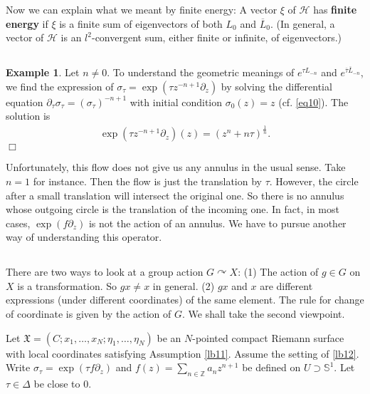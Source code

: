 \documentclass[11pt,b5paper,notitlepage]{article}
\theoremstyle{definition}
\newtheorem{eg}[df]{Example}
\theoremstyle{plain}
\newcommand{\fk}{\mathfrak}
\newcommand{\mc}{\mathcal}
\newcommand{\ovl}{\overline}
\newcommand{\Zbb}{\mathbb Z}
\newcommand{\Sbb}{{\mathbb S}}
\numberwithin{equation}{section}
\begin{document}


Now we can explain what we meant by finite energy: A vector $\xi$ of $\mc H$ has \textbf{finite energy} if $\xi$ is a finite sum of eigenvectors of both $L_0$ and $\ovl L_0$. (In general, a vector of $\mc H$ is an $l^2$-convergent sum, either finite or infinite, of eigenvectors.)




\subsection{}

\begin{eg}\label{lb20}
Let $n\neq 0$. To understand the geometric meanings of $e^{\tau L_{-n}}$ and $e^{\ovl\tau\ovl L_{-n}}$, we find the expression of $\sigma_\tau=\exp(\tau z^{-n+1}\partial_z)$ by solving the differential equation $\partial_\tau\sigma_\tau=(\sigma_\tau)^{-n+1}$ with initial condition $\sigma_0(z)=z$ (cf. \eqref{eq10}). The solution is
\begin{align}
\exp (\tau z^{-n+1}\partial_z)(z)=(z^n+n\tau)^{\frac 1n}.\label{eq17}
\end{align}
\hfill $\Box$
\end{eg}

Unfortunately, this flow does not give us any annulus in the usual sense. Take $n=1$ for instance. Then the flow is just the translation by $\tau$. However, the circle after a small translation will intersect the original one. So there is no annulus whose outgoing circle is the translation of the incoming one. In fact, in most cases,   $\exp(f\partial_z)$ is not the action of an annulus. We have to pursue another way of understanding this operator.



\subsection{}\label{lb13}


There are two ways to look at a group action $G\curvearrowright X$: (1) The action of $g\in G$ on $X$ is a transformation. So $gx\neq x$ in general. (2) $gx$ and $x$ are different expressions (under different coordinates) of the same element. The rule for change of coordinate is given by the action of $G$. We shall take the second viewpoint.



Let $\fk X=(C;x_1,\dots,x_N;\eta_1,\dots,\eta_N)$ be an $N$-pointed compact Riemann surface with local coordinates satisfying Assumption \ref{lb11}. Assume the setting of \ref{lb12}. Write $\sigma_\tau=\exp(\tau f\partial_z)$ and $f(z)=\sum_{n\in\Zbb}a_nz^{n+1}$ be defined on $U\supset\Sbb^1$. Let $\tau\in\Delta$ be close to $0$. 
\end{document}
